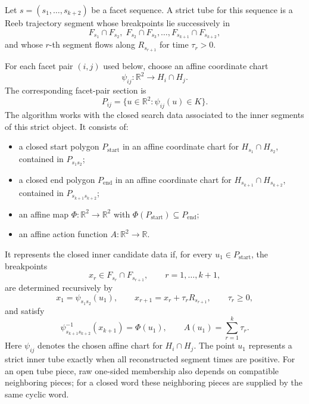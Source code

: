 \begin{unverified}
\begin{definition}\label{def:fg-closed-tube-search-data}
Let \(s=(s_1,\ldots,s_{k+2})\) be a facet sequence.  A strict tube for this
sequence is a Reeb trajectory segment whose breakpoints lie successively in
\[
  F_{s_1}\cap F_{s_2},\;
  F_{s_2}\cap F_{s_3},\ldots,
  F_{s_{k+1}}\cap F_{s_{k+2}},
\]
and whose \(r\)-th segment flows along \(R_{s_{r+1}}\) for time
\(\tau_r>0\).

For each facet pair \((i,j)\) used below, choose an affine coordinate chart
\[
  \psi_{ij}\colon\mathbb R^2\to H_i\cap H_j .
\]
The corresponding facet-pair section is
\[
  P_{ij}=\{u\in\mathbb R^2:\psi_{ij}(u)\in K\}.
\]
The algorithm works with the closed search data associated to the inner
segments of this strict object.  It consists of:
\begin{itemize}
  \item a closed start polygon \(P_{\mathrm{start}}\) in an affine coordinate
  chart for \(H_{s_1}\cap H_{s_2}\), contained in \(P_{s_1s_2}\);
  \item a closed end polygon \(P_{\mathrm{end}}\) in an affine coordinate chart
  for \(H_{s_{k+1}}\cap H_{s_{k+2}}\), contained in
  \(P_{s_{k+1}s_{k+2}}\);
\item an affine map \(\Phi\colon\mathbb R^2\to\mathbb R^2\) with
  \(\Phi(P_{\mathrm{start}})\subseteq P_{\mathrm{end}}\);
\item an affine action function \(A\colon\mathbb R^2\to\mathbb R\).
\end{itemize}
It represents the closed inner candidate data if, for every
\(u_1\in P_{\mathrm{start}}\), the breakpoints
\[
  x_r\in F_{s_r}\cap F_{s_{r+1}},
  \qquad r=1,\ldots,k+1,
\]
are determined recursively by
\[
  x_1=\psi_{s_1s_2}(u_1),
  \qquad
  x_{r+1}=x_r+\tau_rR_{s_{r+1}},
  \qquad
  \tau_r\ge0,
\]
and satisfy
\[
  \psi_{s_{k+1}s_{k+2}}^{-1}(x_{k+1})=\Phi(u_1),
  \qquad
  A(u_1)=\sum_{r=1}^{k}\tau_r .
\]
Here \(\psi_{ij}\) denotes the chosen affine chart for
\(H_i\cap H_j\).  The point \(u_1\) represents a strict inner tube exactly
when all reconstructed segment times are positive.  For an open tube piece,
raw one-sided membership also depends on compatible neighboring pieces; for a
closed word these neighboring pieces are supplied by the same cyclic word.
\end{definition}
\end{unverified}

